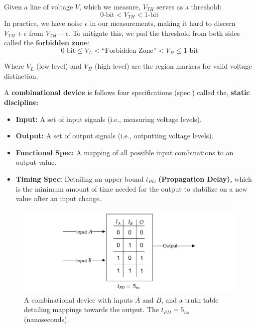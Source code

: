     \begin{Def}

        \label{def:digital_current_encoding_threshold}

        \noindent
        Given a line of voltage $V$, which we measure, $V_{TH}$ serves as a threshold:
        \[
         \text{0-bit} < V_{TH} < \text{1-bit}
        \]
        \noindent
        In practice, we have noise $\epsilon$ in our measurements, making it hard to 
        discern $V_{TH}+\epsilon$ from $V_{TH}-\epsilon$. To mitigate this, we
        pad the threshold from both sides called the \textbf{forbidden zone}:
        \[
        \text{0-bit} \leq V_{L} < \text{``Forbidden Zone''} < V_{H} \leq \text{1-bit}
        \]

        \noindent
        Where $V_L$ (low-level) and $V_H$ (high-level) are the region markers for valid voltage distinction.
    \end{Def}

    \vspace{-.5em}
    \begin{Def}

        \label{def:combinational_device}

        \noindent
        A \textbf{combinational device} is follows four specifications (spec.) called the, \textbf{static discipline}:

        \begin{itemize}
            \item \textbf{Input:} A set of input signals (i.e., measuring voltage levels).
            \item \textbf{Output:} A set of output signals (i.e., outputting voltage levels).
            \item \textbf{Functional Spec:} A mapping of all possible input combinations to an output value.
            \item \textbf{Timing Spec:} Detailing an upper bound $t_{PD}$ \textbf{(Propagation Delay)}, which is the minimum 
            amount of time needed for the output to stabilize on a new value after an input change.
        \end{itemize}
    \end{Def}

    \begin{figure}[ht!]

        \centering
        \includegraphics[width=.82\textwidth]{./Sections/circuits/combin.png}
        \caption{A combinational device with inputs $A$ and $B$, and a truth table detailing mappings towards the output.
        The $t_{PD}=5_{ns}$ (nanoseconds).}
        \label{fig:combinational_device}
    \end{figure}


